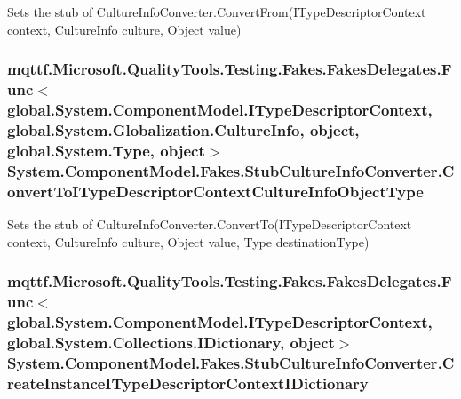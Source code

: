 Sets the stub of Culture\-Info\-Converter.\-Convert\-From(\-I\-Type\-Descriptor\-Context context, Culture\-Info culture, Object value)

\hypertarget{class_system_1_1_component_model_1_1_fakes_1_1_stub_culture_info_converter_a5f23940c0936fcf7f3637a05d3fe81f8}{
\subsubsection[{Convert\-To\-I\-Type\-Descriptor\-Context\-Culture\-Info\-Object\-Type}]{\setlength{\rightskip}{0pt plus 5cm}mqttf.\-Microsoft.\-Quality\-Tools.\-Testing.\-Fakes.\-Fakes\-Delegates.\-Func$<$global.\-System.\-Component\-Model.\-I\-Type\-Descriptor\-Context, global.\-System.\-Globalization.\-Culture\-Info, object, global.\-System.\-Type, object$>$ System.\-Component\-Model.\-Fakes.\-Stub\-Culture\-Info\-Converter.\-Convert\-To\-I\-Type\-Descriptor\-Context\-Culture\-Info\-Object\-Type}}\label{class_system_1_1_component_model_1_1_fakes_1_1_stub_culture_info_converter_a5f23940c0936fcf7f3637a05d3fe81f8}


Sets the stub of Culture\-Info\-Converter.\-Convert\-To(\-I\-Type\-Descriptor\-Context context, Culture\-Info culture, Object value, Type destination\-Type)

\hypertarget{class_system_1_1_component_model_1_1_fakes_1_1_stub_culture_info_converter_a983e9f1c21ce77954cb0b30190deed16}{
\subsubsection[{Create\-Instance\-I\-Type\-Descriptor\-Context\-I\-Dictionary}]{\setlength{\rightskip}{0pt plus 5cm}mqttf.\-Microsoft.\-Quality\-Tools.\-Testing.\-Fakes.\-Fakes\-Delegates.\-Func$<$global.\-System.\-Component\-Model.\-I\-Type\-Descriptor\-Context, global.\-System.\-Collections.\-I\-Dictionary, object$>$ System.\-Component\-Model.\-Fakes.\-Stub\-Culture\-Info\-Converter.\-Create\-Instance\-I\-Type\-Descriptor\-Context\-I\-Dictionary}}\label{class_system_1_1_component_model_1_1_fakes_1_1_stub_culture_info_converter_a983e9f1c21ce77954cb0b30190deed16}


